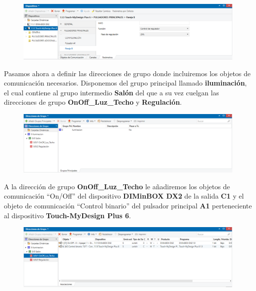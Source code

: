 \documentclass[10pt]{article}
\begin{document}
\begin{figure}[H]
	\begin{center}
	 		\includegraphics[width = 1.00\textwidth]{Imagenes/img9}
	\end{center} 
\end{figure}

Pasamos ahora a definir las direcciones de grupo donde incluiremos los objetos de comunicación necesarios. Disponemos del grupo principal llamado \textbf{iluminación}, el cual contiene al grupo intermedio \textbf{Salón} del que a su vez cuelgan las direcciones de grupo \textbf{OnOff\_Luz\_Techo} y \textbf{Regulación}. \\

\begin{figure}[H]
	\begin{center}
	 		\includegraphics[width = 1.00\textwidth]{Imagenes/img10}
	\end{center} 
\end{figure}

A la dirección de grupo \textbf{OnOff\_Luz\_Techo} le añadiremos los objetos de comunicación ``On/Off'' del dispositivo \textbf{DIMinBOX DX2} de la salida \textbf{C1} y el objeto de comunicación ``Control binario'' del pulsador principal \textbf{A1} perteneciente al dispositivo  \textbf{Touch-MyDesign Plus 6}. \\

\begin{figure}[H]
	\begin{center}
	 		\includegraphics[width = 1.00\textwidth]{Imagenes/img11}
	\end{center} 
\end{figure}
\end{document}

